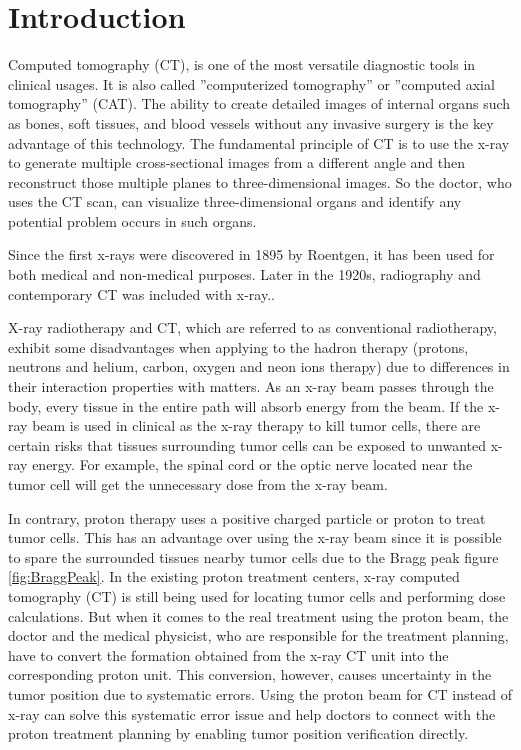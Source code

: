 \documentclass[12pt,a4paper]{article}
\begin{document}
\section{Introduction}

Computed tomography (CT), is one of the most versatile diagnostic tools in clinical usages. It is also called ”computerized tomography” or ”computed axial tomography” (CAT).  The ability to create detailed images of internal organs such as bones, soft tissues, and blood vessels without any invasive surgery is the key advantage of this technology.  The fundamental principle of  CT is to use the x-ray to generate multiple cross-sectional images from a different angle and then reconstruct those multiple planes to three-dimensional images.  So the doctor, who uses the CT scan, can visualize three-dimensional organs and identify any potential problem occurs in such organs.  

Since the first x-rays were discovered in 1895 by Roentgen, it has been used for both medical and non-medical purposes.  Later in the 1920s, radiography and contemporary CT was included with x-ray.\cite{CTandXray}. 

X-ray radiotherapy and CT, which are referred to as conventional radiotherapy, exhibit some disadvantages when applying to the hadron therapy (protons, neutrons and helium, carbon, oxygen and neon ions therapy) \cite{PToverRT} due to differences in their interaction properties with matters.  As an x-ray beam passes through the body, every tissue in the entire path will absorb energy from the beam. If the x-ray beam is used in clinical as the x-ray therapy to kill tumor cells, there are certain risks that tissues surrounding tumor cells can be exposed to unwanted x-ray energy. For example, the spinal cord or the optic nerve located near the tumor cell will get the unnecessary dose from the x-ray beam.

In contrary, proton therapy uses a positive charged particle or proton to treat tumor cells. This has an advantage over using the x-ray beam since it is possible to spare the surrounded tissues nearby tumor cells due to the Bragg peak figure \ref{fig:BraggPeak}.  In the existing proton treatment centers, x-ray computed tomography (CT) is still being used for locating tumor cells and performing dose calculations. But when it comes to the real treatment using the proton beam, the doctor and the medical physicist, who are responsible for the treatment planning, have to convert the formation obtained from the x-ray CT unit into the corresponding proton unit. This conversion, however, causes uncertainty in the tumor position due to systematic errors.  Using the proton beam for CT instead of x-ray can solve this systematic error issue and help doctors to connect with the proton treatment planning by enabling tumor position verification directly.\cite{PTinsteadrRT} 
\end{document}
